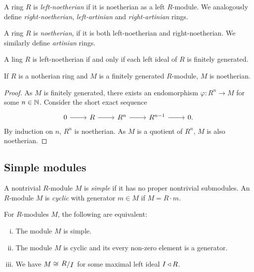 
\begin{definicija}
A ring $R$ is \emph{left-noetherian} if it
is noetherian as a left $R$-module. We analogously define
\emph{right-noetherian}, \emph{left-artinian}
and \emph{right-artinian} rings.

A ring $R$ is \emph{noetherian}, if it is both left-noetherian and
right-noetherian. We similarly define \emph{artinian} rings.
\end{definicija}

\begin{opomba}
A ling $R$ is left-noetherian if and only if each left ideal of $R$
is finitely generated.
\end{opomba}

\begin{trditev}
If $R$ is a notherian ring and $M$ is a finitely generated
$R$-module, $M$ is noetherian.
\end{trditev}

\begin{proof}
As $M$ is finitely generated, there exists an endomorphism
$\varphi \colon R^n \to M$ for some $n \in \mathbb{N}$. Consider the short
exact sequence
\[
\begin{tikzcd}
0 \arrow[r] & R \arrow[r] & R^n \arrow[r] & R^{n-1} \arrow[r] & 0.
\end{tikzcd}
\]
By induction on $n$, $R^n$ is noetherian. As $M$ is a quotient of
$R^n$, $M$ is also noetherian.
\end{proof}

\newpage

\subsection{Simple modules}

\begin{definicija}
A nontrivial $R$-module $M$ is \emph{simple}
if it has no proper nontrivial submodules. An $R$-module $M$ is
\emph{cyclic} with generator $m \in M$ if
$M = R \cdot m$.
\end{definicija}

\begin{trditev}
For $R$-modules $M$, the following are equivalent:

\begin{enumerate}[i)]
\item The module $M$ is simple.
\item The module $M$ is cyclic and its every non-zero element is a
generator.
\item We have $M \cong \kvoc{R}{I}$ for some maximal left ideal
$I \triangleleft R$.
\end{enumerate}
\end{trditev}

